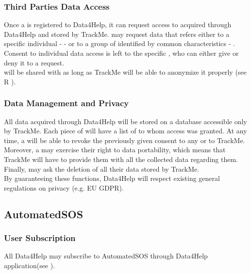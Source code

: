 \documentclass[../../rasd.tex]{subfiles}
\begin{document}
				\subsubsection{Third Parties Data Access}
				Once a  is registered to Data4Help, it can request access to  acquired through Data4Help and stored by TrackMe.  may request data that refers either to a specific individual -  - or to a group of  identified by common characteristics - .\\
				Consent to individual data access is left to the specific , who can either give or deny it to a  request.\\
				 will be shared with  as long as TrackMe will be able to anonymize it properly (see R ).

				\subsubsection{Data Management and Privacy}
				All data acquired through Data4Help will be stored on a database accessible only by TrackMe. Each piece of  will have a list of  to whom access was granted. At any time, a  will be able to revoke the previously given consent to any  or to TrackMe. Moreover, a  may exercise their right to data portability, which means that TrackMe will have to provide them with all the collected data regarding them. Finally,  may ask the deletion of all their data stored by TrackMe. \\
				By guaranteeing these functions, Data4Help will respect existing general regulations on privacy (e.g. EU GDPR).
			
			\subsection{AutomatedSOS}
				
				\subsubsection{User Subscription}
				All Data4Help  may subscribe to AutomatedSOS through Data4Help application(see ).
				
\end{document}
